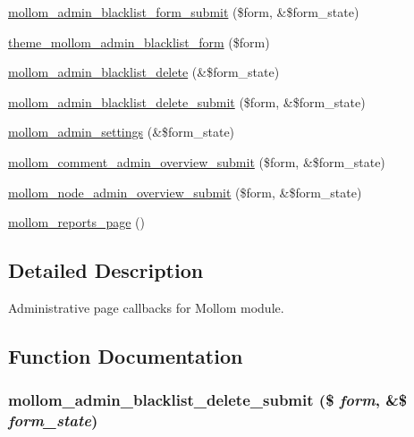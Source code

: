 \begin{CompactItemize}
\item 
\hyperlink{mollom_8admin_8inc_96e8372bde3200d7bf2cb52f6be26d80}{mollom\_\-admin\_\-blacklist\_\-form\_\-submit} (\$form, \&\$form\_\-state)
\item 
\hyperlink{mollom_8admin_8inc_d9c477f6506780058c78ce26e7c7faf2}{theme\_\-mollom\_\-admin\_\-blacklist\_\-form} (\$form)
\item 
\hyperlink{group__forms_g8aa3d33609ffa56c5eba65649c82eec8}{mollom\_\-admin\_\-blacklist\_\-delete} (\&\$form\_\-state)
\item 
\hyperlink{mollom_8admin_8inc_95f138b10a8be8da177bf7bbfe8d7a39}{mollom\_\-admin\_\-blacklist\_\-delete\_\-submit} (\$form, \&\$form\_\-state)
\item 
\hyperlink{mollom_8admin_8inc_74016f613ad66fa23c8169ef90978694}{mollom\_\-admin\_\-settings} (\&\$form\_\-state)
\item 
\hyperlink{mollom_8admin_8inc_9d2bf25920e01ea84e82fc8d3073e4b0}{mollom\_\-comment\_\-admin\_\-overview\_\-submit} (\$form, \&\$form\_\-state)
\item 
\hyperlink{mollom_8admin_8inc_c3a31b646ec25bf37f2b4723b991b487}{mollom\_\-node\_\-admin\_\-overview\_\-submit} (\$form, \&\$form\_\-state)
\item 
\hyperlink{mollom_8admin_8inc_e261b31f0d3924e898b4603eec0d5dad}{mollom\_\-reports\_\-page} ()
\end{CompactItemize}


\subsection{Detailed Description}
Administrative page callbacks for Mollom module. 

\subsection{Function Documentation}
\hypertarget{mollom_8admin_8inc_95f138b10a8be8da177bf7bbfe8d7a39}{
\subsubsection[{mollom\_\-admin\_\-blacklist\_\-delete\_\-submit}]{\setlength{\rightskip}{0pt plus 5cm}mollom\_\-admin\_\-blacklist\_\-delete\_\-submit (\$ {\em form}, \/  \&\$ {\em form\_\-state})}}
\label{mollom_8admin_8inc_95f138b10a8be8da177bf7bbfe8d7a39}


